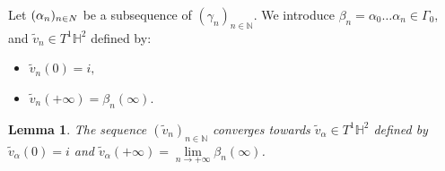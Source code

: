 \documentclass[a4paper,english,reqno]{amsart}
\renewcommand{\H}{\mathbb{H}}
\newcommand{\N}{\mathbb{N}} %
\newtheorem{lemma}{Lemma}
\theoremstyle{definition}
\numberwithin{equation}{section}
\begin{document}
	Let $(\alpha_n)_{n\in\\N}$ be a subsequence of $(\gamma_n)_{n\in \N}.$ We introduce $\beta_n=\alpha_0\ldots\alpha_n\in\Gamma_0,$ and $\tilde v_n\in T^1\H^2$ defined by:
	\begin{itemize}
		\item $\tilde v_n(0)=i,$
		\item $\tilde v_n(+\infty)=\beta_n(\infty)$.
	\end{itemize}
	

\begin{lemma}\label{lemma_vectors}
	The sequence $(\tilde v_n)_{n\in\N}$ converges towards $\tilde v_\alpha\in T^1 \H^2 $ defined by $\tilde v_\alpha (0)=i$ and $\tilde v_\alpha(+\infty)=\lim\limits_{n\to +\infty}\beta_n(\infty)$.
	
\end{lemma}
\end{document}
